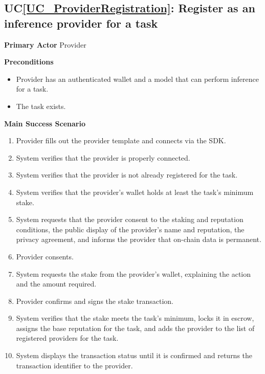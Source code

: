 \documentclass[12pt]{article}
\newcounter{ucnum} %
\newcommand{\ucref}[1]{UC\ref{#1}}
\begin{document}
 \label{UC_ProviderRegistration}
\subsection{\ucref{UC_ProviderRegistration}: Register as an inference provider for a task}

\textbf{Primary Actor}
Provider

\textbf{Preconditions}
\begin{itemize}
\item Provider has an authenticated wallet and a model that can perform inference for a task.
\item The task exists.
\end{itemize}

\textbf{Main Success Scenario}
\begin{enumerate}
\item Provider fills out the provider template and connects via the SDK.
\item System verifies that the provider is properly connected.
\item System verifies that the provider is not already registered for the task.
\item System verifies that the provider's wallet holds at least the task's minimum stake.
\item System requests that the provider consent to the staking and reputation conditions, the public display of the provider's name and reputation, the privacy agreement, and informs the provider that on-chain data is permanent.
\item Provider consents.
\item System requests the stake from the provider's wallet, explaining the action and the amount required.
\item Provider confirms and signs the stake transaction.
\item System verifies that the stake meets the task's minimum, locks it in escrow, assigns the base reputation for the task, and adds the provider to the list of registered providers for the task.
\item System displays the transaction status until it is confirmed and returns the transaction identifier to the provider.
\end{enumerate}
\end{document}
